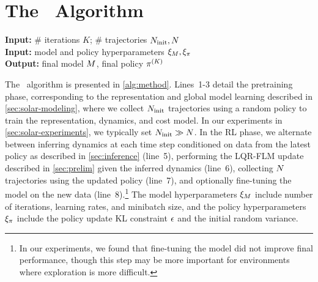 \section{The \metabbr\ Algorithm}
\label{sec:method}

\begin{algorithm}[t]
\hspace*{\algorithmicindent}\textbf{Input:} \# iterations $K$; \# trajectories $N_{\text{init}},N$\\
\hspace*{\algorithmicindent}\textbf{Input:} model and policy hyperparameters $\xi_M, \xi_\pi$\\
\hspace*{\algorithmicindent}\textbf{Output:} final model $M$, final policy $\pi^{(K)}$\\
\vspace{-.5em}
\begin{algorithmic}[1]
\ENDFOR
\end{algorithmic}
\caption{\metabbr}
\label{alg:method}
\end{algorithm}

The \metabbr\ algorithm is presented in \autoref{alg:method}. Lines~\mbox{1-3} detail the pretraining phase, corresponding to the representation and global model learning described in \autoref{sec:solar-modeling}, where we collect $N_{\text{init}}$ trajectories using a random policy to train the representation, dynamics, and cost model. In our experiments in \autoref{sec:solar-experiments}, we typically set $N_{\text{init}}\gg N$. In the RL phase, we alternate between inferring dynamics at each time step conditioned on data from the latest policy as described in \autoref{sec:inference} (line~5), performing the LQR-FLM update described in \autoref{sec:prelim} given the inferred dynamics (line~6), collecting $N$ trajectories using the updated policy (line~7), and optionally fine-tuning the model on the new data (line~8).\footnote{In our experiments, we found that fine-tuning the model did not improve final performance, though this step may be more important for environments where exploration is more difficult.} The model hyperparameters $\xi_M$ include number of iterations, learning rates, and minibatch size, and the policy hyperparameters $\xi_\pi$ include the policy update KL constraint $\epsilon$ and the initial random variance.

